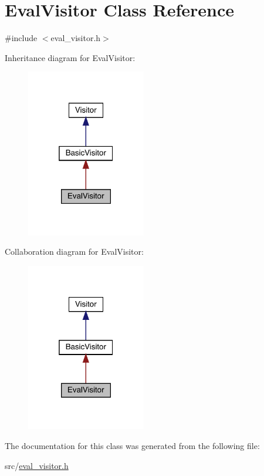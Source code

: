 \hypertarget{class_eval_visitor}{}\section{Eval\+Visitor Class Reference}
\label{class_eval_visitor}


{\ttfamily \#include $<$eval\+\_\+visitor.\+h$>$}



Inheritance diagram for Eval\+Visitor\+:
\nopagebreak
\begin{figure}[H]
\begin{center}
\leavevmode
\includegraphics[width=148pt]{class_eval_visitor__inherit__graph}
\end{center}
\end{figure}


Collaboration diagram for Eval\+Visitor\+:
\nopagebreak
\begin{figure}[H]
\begin{center}
\leavevmode
\includegraphics[width=148pt]{class_eval_visitor__coll__graph}
\end{center}
\end{figure}


The documentation for this class was generated from the following file\+:\begin{DoxyCompactItemize}
\item 
src/\hyperlink{eval__visitor_8h}{eval\+\_\+visitor.\+h}\end{DoxyCompactItemize}
